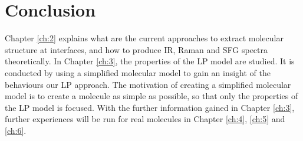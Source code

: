 \section{Conclusion}
Chapter \ref{ch:2} explains what are the current approaches to extract molecular structure at interfaces, and how to produce IR, Raman and SFG spectra theoretically. In Chapter \ref{ch:3}, the properties of the LP model are studied. It is conducted by using a simplified molecular model to gain an insight of the behaviours our LP approach. The motivation of creating a simplified molecular model is to create a molecule as simple as possible, so that only the properties of the LP model is focused. With the further information gained in Chapter \ref{ch:3}, further experiences will be run for real molecules in Chapter \ref{ch:4}, \ref{ch:5} and \ref{ch:6}.